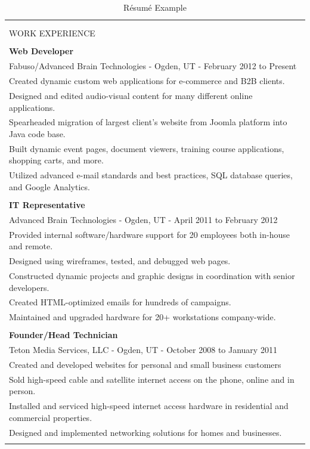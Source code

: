\begin{table}[!p]
 \small
\caption{R\'esum\'e Example} %
\centering %
\begin{tabular}{    |  p{15cm} |  }
\hline
\begin{center}\normalsize{\textbf {Ryan Richman}}\\
\end{center}
\\
WORK EXPERIENCE\\
\\
\textbf{Web Developer}\\
Fabuso/Advanced Brain Technologies - Ogden, UT - February 2012 to Present \\
Created dynamic custom web applications for e-commerce and B2B clients. \\
Designed and edited audio-visual content for many different online applications. \\
Spearheaded migration of largest client's website from Joomla platform into Java code base. \\
Built dynamic event pages, document viewers, training course applications, shopping carts, and more. \\
Utilized advanced e-mail standards and best practices, SQL database queries, and Google Analytics.\\
\\
\textbf{IT Representative}\\
Advanced Brain Technologies - Ogden, UT - April 2011 to February 2012 \\
Provided internal software/hardware support for 20 employees both in-house and remote. \\
Designed using wireframes, tested, and debugged web pages. \\
Constructed dynamic projects and graphic designs in coordination with senior developers. \\
Created HTML-optimized emails for hundreds of campaigns. \\
Maintained and upgraded hardware for 20+ workstations company-wide. \\
\\
\textbf{Founder/Head Technician}\\
Teton Media Services, LLC - Ogden, UT - October 2008 to January 2011 \\
Created and developed websites for personal and small business customers \\
Sold high-speed cable and satellite internet access on the phone, online and in person. \\
Installed and serviced high-speed internet access hardware in residential and commercial properties. \\
Designed and implemented networking solutions for homes and businesses. \\
\\


\end{tabular}
\end{table}

